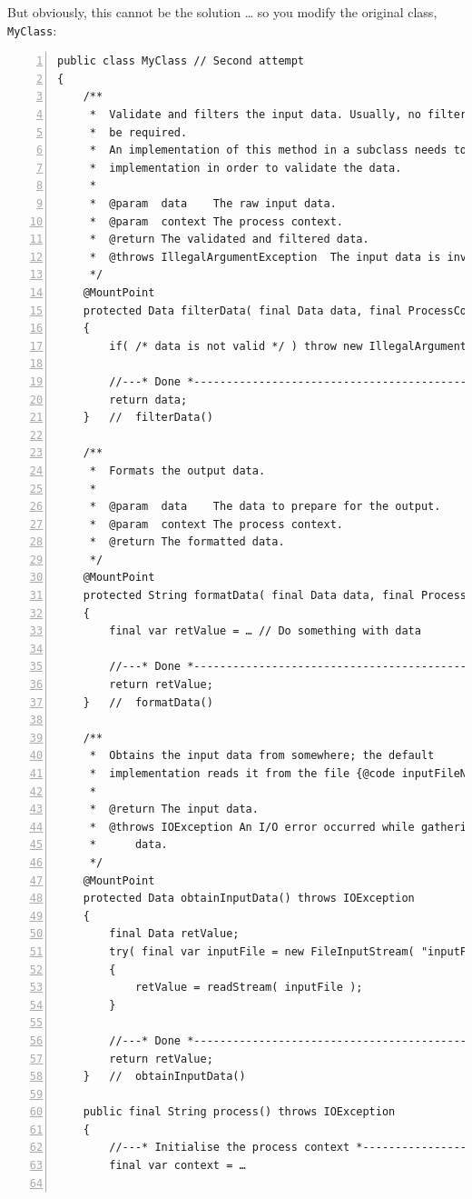 \documentclass[11pt,a4paper, titlepage, parskip=half, headsepline, footsepline, cleardoublepage=current, headheight=1cm]{scrbook}
\begin{document}
But obviously, this cannot be the solution … so you modify the original class, \lstinline|MyClass|:
\begin{lstlisting}[numbers=left]
public class MyClass // Second attempt
{
    /**
     *  Validate and filters the input data. Usually, no filtering should
     *  be required.
     *  An implementation of this method in a subclass needs to call this
     *  implementation in order to validate the data.
     *  
     *  @param  data    The raw input data.
     *  @param  context The process context.
     *  @return	The validated and filtered data.
     *  @throws IllegalArgumentException  The input data is invalid.
     */
    @MountPoint 
    protected Data filterData( final Data data, final ProcessContext context )
    {
        if( /* data is not valid */ ) throw new IllegalArgumentException();
        
        //---* Done *------------------------------------------------
        return data;
    }   //  filterData()
    
    /**
     *  Formats the output data.
     * 
     *  @param  data    The data to prepare for the output.
     *  @param  context The process context.
     *  @return	The formatted data.
     */
    @MountPoint
    protected String formatData( final Data data, final ProcessContext context )
    {
        final var retValue = … // Do something with data
        
        //---* Done *------------------------------------------------
        return retValue;
    }   //  formatData()
    
    /**
     *  Obtains the input data from somewhere; the default 
     *  implementation reads it from the file {@code inputFileName}.
     *
     *  @return The input data.
     *  @throws IOException An I/O error occurred while gathering the 
     *      data.
     */
    @MountPoint
    protected Data obtainInputData() throws IOException
    {
        final Data retValue;
        try( final var inputFile = new FileInputStream( "inputFileName" ) )
        {
            retValue = readStream( inputFile );
        }
        
        //---* Done *------------------------------------------------
        return retValue;
    }   //  obtainInputData()
        
    public final String process() throws IOException
    {
        //---* Initialise the process context *----------------------
        final var context = …
        

\end{lstlisting}
\end{document}
